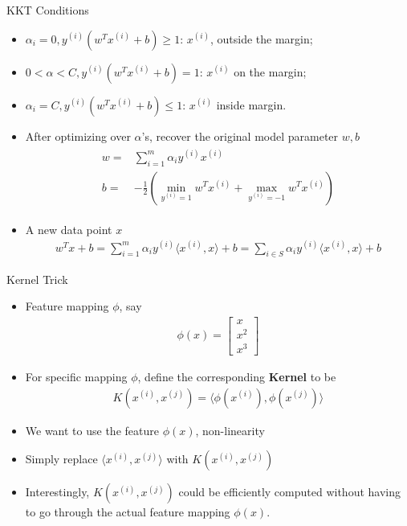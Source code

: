 \documentclass{beamer}
\begin{document}
\begin{frame}{KKT Conditions}
\begin{itemize}
	\item $\alpha_i=0, y^{(i)}(w^Tx^{(i)}+b)\geq 1$: $x^{(i)}$, outside the margin;
	\item $0< \alpha< C, y^{(i)}(w^Tx^{(i)}+b) = 1$: $x^{(i)}$ on the margin;
	\item $\alpha_i=C, y^{(i)}(w^Tx^{(i)}+b) \leq 1$: $x^{(i)}$ inside margin.
	\item After optimizing over $\alpha$'s, recover the original model parameter $w, b$
	\begin{align}\label{eq:wb}
	\begin{split}
	w=&\sum_{i=1}^m\alpha_iy^{(i)}x^{(i)}\\
	b=&-\frac{1}{2}\left(\min_{y^{(i)}=1}w^Tx^{(i)} + \max_{y^{(i)}=-1}w^Tx^{(i)}\right)
	\end{split}
	\end{align}
	\item A new data point $x$
	\begin{align*}
		w^Tx + b = \sum_{i=1}^m\alpha_iy^{(i)}\langle x^{(i)}, x\rangle + b =\sum_{i\in S}\alpha_iy^{(i)}\langle x^{(i)}, x\rangle + b
	\end{align*}
\end{itemize}
\end{frame}

\begin{frame}{Kernel Trick}
\begin{itemize}
\item Feature mapping $\phi$, say
\begin{align*}
\phi(x) = \begin{bmatrix}
x\\
x^2\\
x^3
\end{bmatrix}
\end{align*}
\item For specific mapping $\phi$, define the corresponding \textbf{Kernel} to be
\begin{align*}
K(x^{(i)}, x^{(j)}) = \langle \phi(x^{(i)}), \phi(x^{(j)})\rangle
\end{align*}
\item We want to use the feature $\phi(x)$, non-linearity
\item Simply replace $\langle x^{(i)}, x^{(j)}\rangle$ with $K(x^{(i)}, x^{(j)})$
\item Interestingly, $K(x^{(i)}, x^{(j)})$ could be efficiently computed without having to go through the actual feature mapping $\phi(x)$.
\end{itemize}
\end{frame}
\end{document}
